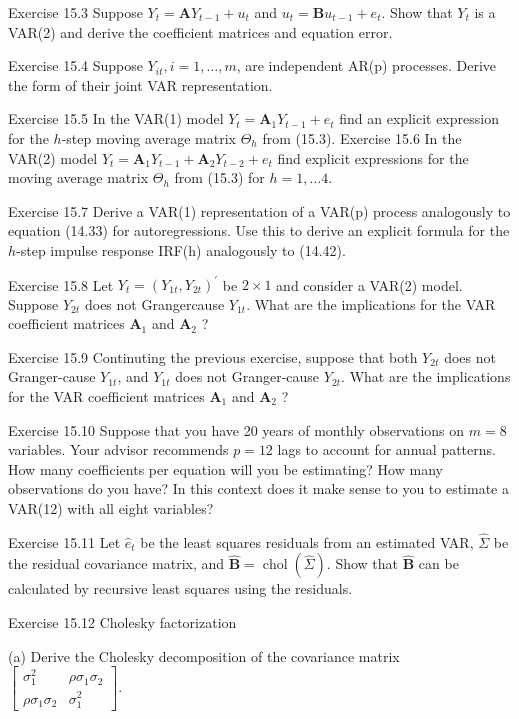 \documentclass[10pt]{article}
\begin{document}
Exercise 15.3 Suppose $Y_{t}=\boldsymbol{A} Y_{t-1}+u_{t}$ and $u_{t}=\boldsymbol{B} u_{t-1}+e_{t}$. Show that $Y_{t}$ is a VAR(2) and derive the coefficient matrices and equation error.

Exercise 15.4 Suppose $Y_{i t}, i=1, \ldots, m$, are independent AR(p) processes. Derive the form of their joint VAR representation.

Exercise 15.5 In the VAR(1) model $Y_{t}=\boldsymbol{A}_{1} Y_{t-1}+e_{t}$ find an explicit expression for the $h$-step moving average matrix $\Theta_{h}$ from (15.3). Exercise 15.6 In the VAR(2) model $Y_{t}=\boldsymbol{A}_{1} Y_{t-1}+\boldsymbol{A}_{2} Y_{t-2}+e_{t}$ find explicit expressions for the moving average matrix $\Theta_{h}$ from (15.3) for $h=1, \ldots 4$.

Exercise 15.7 Derive a VAR(1) representation of a VAR(p) process analogously to equation (14.33) for autoregressions. Use this to derive an explicit formula for the $h$-step impulse response IRF(h) analogously to (14.42).

Exercise 15.8 Let $Y_{t}=\left(Y_{1 t}, Y_{2 t}\right)^{\prime}$ be $2 \times 1$ and consider a VAR(2) model. Suppose $Y_{2 t}$ does not Grangercause $Y_{1 t}$. What are the implications for the VAR coefficient matrices $\boldsymbol{A}_{1}$ and $\boldsymbol{A}_{2}$ ?

Exercise 15.9 Continuting the previous exercise, suppose that both $Y_{2 t}$ does not Granger-cause $Y_{1 t}$, and $Y_{1 t}$ does not Granger-cause $Y_{2 t}$. What are the implications for the VAR coefficient matrices $\boldsymbol{A}_{1}$ and $\boldsymbol{A}_{2}$ ?

Exercise 15.10 Suppose that you have 20 years of monthly observations on $m=8$ variables. Your advisor recommends $p=12$ lags to account for annual patterns. How many coefficients per equation will you be estimating? How many observations do you have? In this context does it make sense to you to estimate a VAR(12) with all eight variables?

Exercise 15.11 Let $\widehat{e}_{t}$ be the least squares residuals from an estimated VAR, $\widehat{\Sigma}$ be the residual covariance matrix, and $\widehat{\boldsymbol{B}}=\operatorname{chol}(\widehat{\Sigma})$. Show that $\widehat{\boldsymbol{B}}$ can be calculated by recursive least squares using the residuals.

Exercise 15.12 Cholesky factorization

(a) Derive the Cholesky decomposition of the covariance matrix $\left[\begin{array}{cc}\sigma_{1}^{2} & \rho \sigma_{1} \sigma_{2} \\ \rho \sigma_{1} \sigma_{2} & \sigma_{1}^{2}\end{array}\right]$.
\end{document}

